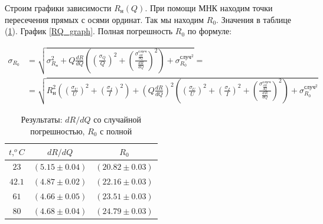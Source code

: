 \documentclass[a4paper, 12pt]{article}
\begin{document}
            Строим графики зависимости $R_н(Q)$. При помощи МНК находим точки пересечения прямых с осями ординат. Так мы находим $R_0$. Значения в таблице (\ref{RQ_coeffs}). График \ref{RQ_graph}. Полная погрешность $R_0$ по формуле:

            \begin{align*}
                \sigma_{R_0} &= \sqrt{\sigma_{R_н}^2 + Q \frac{dR}{dQ} \left( \left( \frac{\sigma_Q}{Q} \right)^2 + \left( \frac{\sigma_{\frac{dR}{dQ}}^{случ}}{\frac{dR}{dQ}} \right)^2 \right) + \sigma_{R_0}^{{случ}^2}} = \\
                &= \sqrt{R_н^2 \left( \left( \frac{\sigma_{U}}{U} \right)^2 + \left( \frac{\sigma_{I}}{I} \right)^2 \right) + \left( Q \frac{dR}{dQ} \right)^2 \left( \left( \frac{\sigma_U}{U} \right)^2 + \left( \frac{\sigma_I}{I} \right)^2 + \left( \frac{\sigma_{\frac{dR}{dQ}}^{случ}}{\frac{dR}{dQ}} \right)^2 \right) + \sigma_{R_0}^{{случ}^2}}
            \end{align*}

            \begin{table}[!ht]
                \centering
                \begin{tabular}{|c|c|c|}
                    \hline

                    $t, ^oC$ & $dR/dQ$ & $R_0$\\ \hline
                    $23$ & $(5.15 \pm 0.04)$ & $(20.82 \pm 0.03)$\\ \hline
                    $42.1$ & $(4.87 \pm 0.02)$ & $(22.16 \pm 0.03)$\\ \hline
                    $61$ & $(4.66 \pm 0.05)$ & $(23.51 \pm 0.03)$\\ \hline
                    $80$ & $(4.68 \pm 0.04)$ & $(24.79 \pm 0.03)$\\ \hline

                \end{tabular}
                \caption{Результаты: $dR/dQ$ со случайной погрешностью, $R_0$ с полной}
                \label{RQ_coeffs}
            \end{table}
\end{document}
